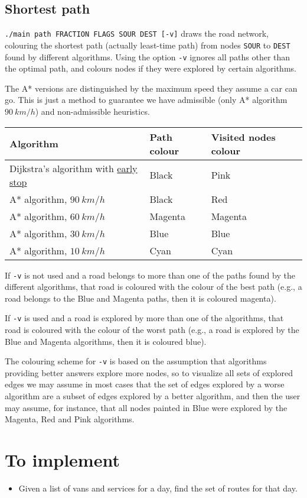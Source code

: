 \subsection{Shortest path}
\texttt{./main path FRACTION FLAGS SOUR DEST [-v]} draws the road network, colouring the shortest path (actually least-time path) from nodes \texttt{SOUR} to \texttt{DEST} found by different algorithms. Using the option \texttt{-v} ignores all paths other than the optimal path, and colours nodes if they were explored by certain algorithms.\par
The A* versions are distinguished by the maximum speed they assume a car can go. This is just a method to guarantee we have admissible (only A* algorithm $\SI{90}{km/h}$) and non-admissible heuristics.
\begin{center}
    \begin{tabular}{l | l | l}
        \textbf{Algorithm}            & \textbf{Path colour} & \textbf{Visited nodes colour} \\ \hline
        Dijkstra's algorithm with \hyperref[alg:dijkstra-early-stop]{early stop} & Black                & Pink                          \\
        A* algorithm, $\SI{90}{km/h}$ & Black                & Red                           \\
        A* algorithm, $\SI{60}{km/h}$ & Magenta              & Magenta                       \\
        A* algorithm, $\SI{30}{km/h}$ & Blue                 & Blue                          \\
        A* algorithm, $\SI{10}{km/h}$ & Cyan                 & Cyan                          
    \end{tabular}
\end{center}
If \texttt{-v} is not used and a road belongs to more than one of the paths found by the different algorithms, that road is coloured with the colour of the best path (e.g., a road belongs to the Blue and Magenta paths, then it is coloured magenta).\par
If \texttt{-v} is used and a road is explored by more than one of the algorithms, that road is coloured with the colour of the worst path (e.g., a road is explored by the Blue and Magenta algorithms, then it is coloured blue).\par
The colouring scheme for \texttt{-v} is based on the assumption that algorithms providing better answers explore more nodes, so to visualize all sets of explored edges we may assume in most cases that the set of edges explored by a worse algorithm are a subset of edges explored by a better algorithm, and then the user may assume, for instance, that all nodes painted in Blue were explored by the Magenta, Red and Pink algorithms.
\section{To implement}
\begin{itemize}
    \item Given a list of vans and services for a day, find the set of routes for that day.
\end{itemize}

